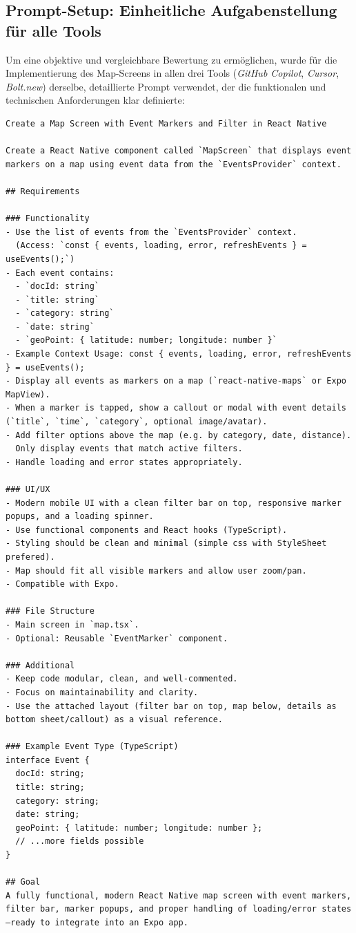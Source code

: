 \subsection{Prompt-Setup: Einheitliche Aufgabenstellung für alle Tools}
\label{sec:prompt-setup}

Um eine objektive und vergleichbare Bewertung zu ermöglichen, wurde für die
Implementierung des Map-Screens in allen drei Tools (\textit{GitHub Copilot},
\textit{Cursor}, \textit{Bolt.new}) derselbe, detaillierte Prompt verwendet,
der die funktionalen und technischen Anforderungen klar definierte:

\begin{promptbox}
      \begin{verbatim}
Create a Map Screen with Event Markers and Filter in React Native

Create a React Native component called `MapScreen` that displays event markers on a map using event data from the `EventsProvider` context.

## Requirements

### Functionality
- Use the list of events from the `EventsProvider` context.  
  (Access: `const { events, loading, error, refreshEvents } = useEvents();`)
- Each event contains:
  - `docId: string`
  - `title: string`
  - `category: string`
  - `date: string`
  - `geoPoint: { latitude: number; longitude: number }`
- Example Context Usage: const { events, loading, error, refreshEvents } = useEvents();
- Display all events as markers on a map (`react-native-maps` or Expo MapView).
- When a marker is tapped, show a callout or modal with event details (`title`, `time`, `category`, optional image/avatar).
- Add filter options above the map (e.g. by category, date, distance).  
  Only display events that match active filters.
- Handle loading and error states appropriately.

### UI/UX
- Modern mobile UI with a clean filter bar on top, responsive marker popups, and a loading spinner.
- Use functional components and React hooks (TypeScript).
- Styling should be clean and minimal (simple css with StyleSheet prefered).
- Map should fit all visible markers and allow user zoom/pan.
- Compatible with Expo.

### File Structure
- Main screen in `map.tsx`.
- Optional: Reusable `EventMarker` component.

### Additional
- Keep code modular, clean, and well-commented.
- Focus on maintainability and clarity.
- Use the attached layout (filter bar on top, map below, details as bottom sheet/callout) as a visual reference.

### Example Event Type (TypeScript)
interface Event {
  docId: string;
  title: string;
  category: string;
  date: string;
  geoPoint: { latitude: number; longitude: number };
  // ...more fields possible
}

## Goal
A fully functional, modern React Native map screen with event markers, filter bar, marker popups, and proper handling of loading/error states—ready to integrate into an Expo app.
\end{verbatim}
\end{promptbox}

